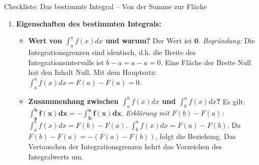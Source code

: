 \begin{loesungsumgebung}{Checkliste: Das bestimmte Integral – Von der Summe zur Fläche}
\begin{enumerate}[label=(\alph*)]
    \item \textbf{Eigenschaften des bestimmten Integrals:}
    \begin{itemize}
        \item \textbf{Wert von $\int_a^a f(x)dx$ und warum?}
        Der Wert ist $\mathbf{0}$.
        \textit{Begründung:} Die Integrationsgrenzen sind identisch, d.h. die Breite des Integrationsintervalls ist $b-a = a-a = 0$. Eine Fläche der Breite Null hat den Inhalt Null.
        Mit dem Hauptsatz: $\int_a^a f(x)dx = F(a) - F(a) = 0$.

        \item \textbf{Zusammenhang zwischen $\int_a^b f(x)dx$ und $\int_b^a f(x)dx$?}
        Es gilt: $\mathbf{\int_a^b f(x)dx = -\int_b^a f(x)dx}$.
        \textit{Erklärung mit $F(b)-F(a)$:}
        $\int_a^b f(x)dx = F(b) - F(a)$.
        $\int_b^a f(x)dx = F(a) - F(b)$.
        Da $F(b) - F(a) = -(F(a) - F(b))$, folgt die Beziehung. Das Vertauschen der Integrationsgrenzen kehrt das Vorzeichen des Integralwerts um.
    \end{itemize}
\end{enumerate}

\end{loesungsumgebung}

